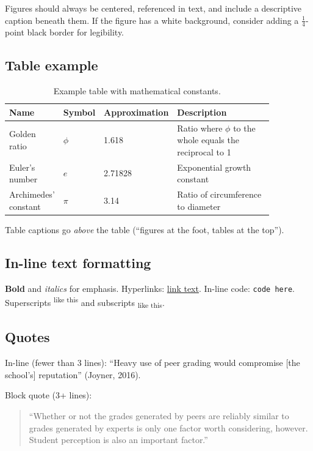\documentclass[
	letterpaper, %
]{jdf}
\begin{document}
Figures should always be centered, referenced in text, and include a descriptive caption beneath them. If the figure has a white background, consider adding a $\frac{1}{4}$-point black border for legibility.

\subsection*{Table example}

\begin{table}[h]
	\caption{Example table with mathematical constants.}
	\small
	\centering
	\begin{tabular}{L{0.17\linewidth} C{0.12\linewidth} L{0.17\linewidth} L{0.4\linewidth}}
		\textbf{Name} & \textbf{Symbol} & \textbf{Approximation} & \textbf{Description} \\
		\toprule[0.5pt]
		Golden ratio & $\phi$ & 1.618 & Ratio where $\phi$ to the whole equals the reciprocal to 1 \\
		\midrule
		Euler's number & $e$ & 2.71828 & Exponential growth constant \\
		\midrule
		Archimedes' constant & $\pi$ & 3.14 & Ratio of circumference to diameter \\
	\end{tabular}
\end{table}

Table captions go \textit{above} the table (``figures at the foot, tables at the top'').

\subsection*{In-line text formatting}

\textbf{Bold} and \textit{italics} for emphasis. Hyperlinks: \href{https://example.com}{link text}. In-line code: {\tt code here}. Superscripts\textsuperscript{ like this} and subscripts\textsubscript{ like this}.

\subsection*{Quotes}

In-line (fewer than 3 lines): ``Heavy use of peer grading would compromise [the school's] reputation'' (Joyner, 2016).

Block quote (3+ lines):

\begin{quotation}
	\noindent ``Whether or not the grades generated by peers are reliably similar to grades generated by experts is only one factor worth considering, however. Student perception is also an important factor.''
\end{quotation}
\end{document}
